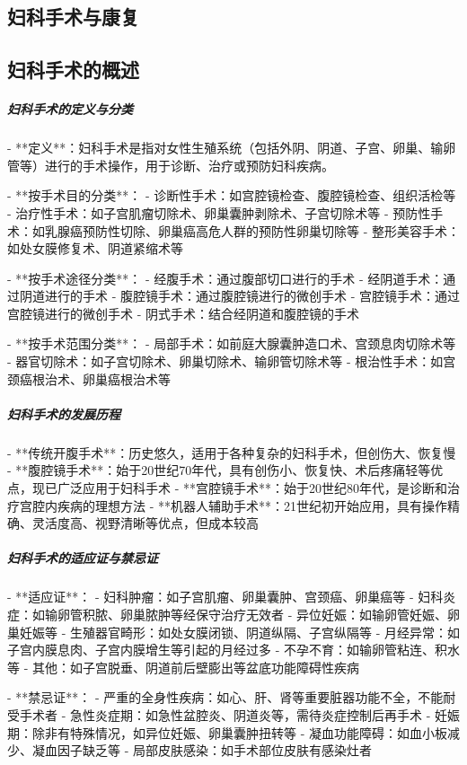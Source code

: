 \begin{enumerate}
\section{妇科手术与康复}

\subsection{妇科手术的概述}

\subparagraph{妇科手术的定义与分类}

- **定义**：妇科手术是指对女性生殖系统（包括外阴、阴道、子宫、卵巢、输卵管等）进行的手术操作，用于诊断、治疗或预防妇科疾病。

- **按手术目的分类**：
  - 诊断性手术：如宫腔镜检查、腹腔镜检查、组织活检等
  - 治疗性手术：如子宫肌瘤切除术、卵巢囊肿剥除术、子宫切除术等
  - 预防性手术：如乳腺癌预防性切除、卵巢癌高危人群的预防性卵巢切除等
  - 整形美容手术：如处女膜修复术、阴道紧缩术等

- **按手术途径分类**：
  - 经腹手术：通过腹部切口进行的手术
  - 经阴道手术：通过阴道进行的手术
  - 腹腔镜手术：通过腹腔镜进行的微创手术
  - 宫腔镜手术：通过宫腔镜进行的微创手术
  - 阴式手术：结合经阴道和腹腔镜的手术

- **按手术范围分类**：
  - 局部手术：如前庭大腺囊肿造口术、宫颈息肉切除术等
  - 器官切除术：如子宫切除术、卵巢切除术、输卵管切除术等
  - 根治性手术：如宫颈癌根治术、卵巢癌根治术等

\subparagraph{妇科手术的发展历程}

- **传统开腹手术**：历史悠久，适用于各种复杂的妇科手术，但创伤大、恢复慢
- **腹腔镜手术**：始于20世纪70年代，具有创伤小、恢复快、术后疼痛轻等优点，现已广泛应用于妇科手术
- **宫腔镜手术**：始于20世纪80年代，是诊断和治疗宫腔内疾病的理想方法
- **机器人辅助手术**：21世纪初开始应用，具有操作精确、灵活度高、视野清晰等优点，但成本较高

\subparagraph{妇科手术的适应证与禁忌证}

- **适应证**：
  - 妇科肿瘤：如子宫肌瘤、卵巢囊肿、宫颈癌、卵巢癌等
  - 妇科炎症：如输卵管积脓、卵巢脓肿等经保守治疗无效者
  - 异位妊娠：如输卵管妊娠、卵巢妊娠等
  - 生殖器官畸形：如处女膜闭锁、阴道纵隔、子宫纵隔等
  - 月经异常：如子宫内膜息肉、子宫内膜增生等引起的月经过多
  - 不孕不育：如输卵管粘连、积水等
  - 其他：如子宫脱垂、阴道前后壁膨出等盆底功能障碍性疾病

- **禁忌证**：
  - 严重的全身性疾病：如心、肝、肾等重要脏器功能不全，不能耐受手术者
  - 急性炎症期：如急性盆腔炎、阴道炎等，需待炎症控制后再手术
  - 妊娠期：除非有特殊情况，如异位妊娠、卵巢囊肿扭转等
  - 凝血功能障碍：如血小板减少、凝血因子缺乏等
  - 局部皮肤感染：如手术部位皮肤有感染灶者


\end{enumerate}
